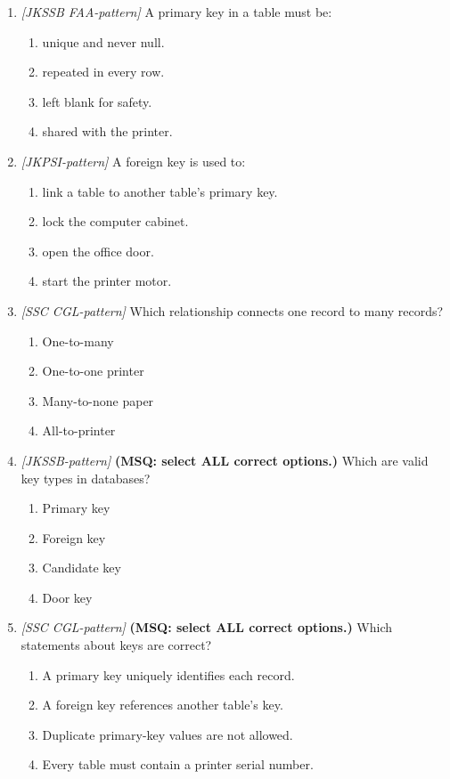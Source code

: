 \documentclass[11pt]{article}
\begin{document}
\begin{enumerate}[label=\textbf{Q\arabic*.}, leftmargin=*]
\item \textit{[JKSSB FAA-pattern]} A primary key in a table must be:
  \begin{enumerate}[label=\Alph*.]
    \item unique and never null.
    \item repeated in every row.
    \item left blank for safety.
    \item shared with the printer.
  \end{enumerate}
\item \textit{[JKPSI-pattern]} A foreign key is used to:
  \begin{enumerate}[label=\Alph*.]
    \item link a table to another table's primary key.
    \item lock the computer cabinet.
    \item open the office door.
    \item start the printer motor.
  \end{enumerate}
\item \textit{[SSC CGL-pattern]} Which relationship connects one record to many records?
  \begin{enumerate}[label=\Alph*.]
    \item One-to-many
    \item One-to-one printer
    \item Many-to-none paper
    \item All-to-printer
  \end{enumerate}
\item \textit{[JKSSB-pattern]} \textbf{(MSQ: select ALL correct options.)} Which are valid key types in databases?
  \begin{enumerate}[label=\Alph*.]
    \item Primary key
    \item Foreign key
    \item Candidate key
    \item Door key
  \end{enumerate}
\item \textit{[SSC CGL-pattern]} \textbf{(MSQ: select ALL correct options.)} Which statements about keys are correct?
  \begin{enumerate}[label=\Alph*.]
    \item A primary key uniquely identifies each record.
    \item A foreign key references another table's key.
    \item Duplicate primary-key values are not allowed.
    \item Every table must contain a printer serial number.
  \end{enumerate}
\end{enumerate}
\def\JKSSBLessonID{29}\def\JKSSBAnswers{0}
\end{document}
